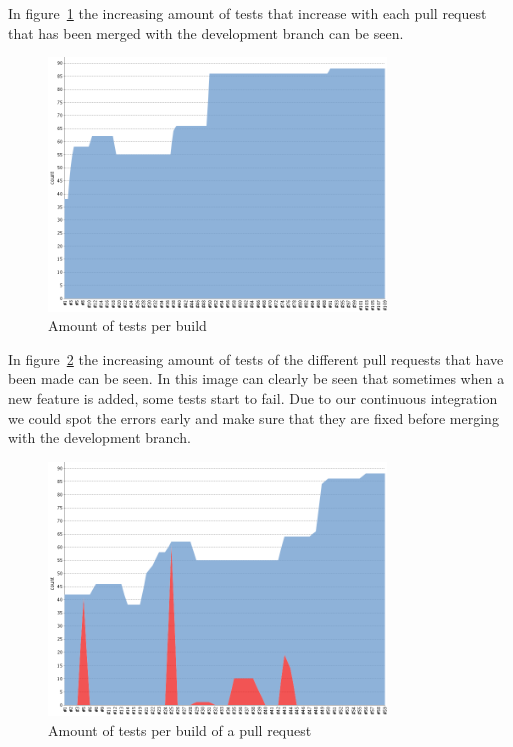 In figure~\ref{testresulttrenddev} the increasing amount of tests that increase with each pull request that has been merged with the development branch can be seen.
\begin{figure}[H]
    \centering
    \includegraphics[width=0.8\textwidth]{images/TestresultTrendDev2}
    \caption{Amount of tests per build}
    \label{testresulttrenddev}
\end{figure}

In figure~\ref{testresulttrendpullrequest} the increasing amount of tests of the different pull requests that have been made can be seen.
In this image can clearly be seen that sometimes when a new feature is added, some tests start to fail.
Due to our continuous integration we could spot the errors early and make sure that they are fixed before merging with the development branch.

\begin{figure}[H]
    \centering
    \includegraphics[width=0.8\textwidth]{images/TestresultTrendPullRequests}
    \caption{Amount of tests per build of a pull request}
    \label{testresulttrendpullrequest}
\end{figure}

